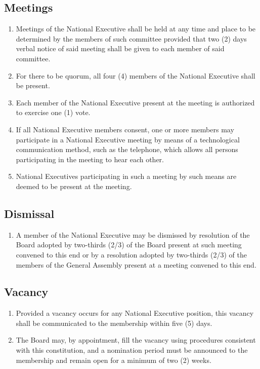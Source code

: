 \subsection{Meetings}
\label{meetings-1}

\begin{enumerate}
 \item
  Meetings of the National Executive shall be held at any time and place to be determined by the members of such committee provided that two (2) days verbal notice of said meeting shall be given to each member of said committee.
 \item
  For there to be quorum, all four (4) members of the National Executive shall be present.
 \item
  Each member of the National Executive present at the meeting is authorized to exercise one (1) vote.
 \item
  If all National Executive members consent, one or more members may participate in a National Executive meeting by means of a technological communication method, such as the telephone, which allows all persons participating in the meeting to hear each other.
 \item
  National Executives participating in such a meeting by such means are deemed to be present at the meeting.
\end{enumerate}

\subsection{Dismissal}
\label{dismissal}

\begin{enumerate}
 \item
  A member of the National Executive may be dismissed by resolution of the Board adopted by two-thirds (2/3) of the Board present at such meeting convened to this end or by a resolution adopted by two-thirds (2/3) of the members of the General Assembly present at a meeting convened to this end.
\end{enumerate}

\subsection{Vacancy}
\label{vacancy-1}

\begin{enumerate}
 \item
  Provided a vacancy occurs for any National Executive position, this vacancy shall be communicated to the membership within five (5) days.
 \item
  The Board may, by appointment, fill the vacancy using procedures consistent with this constitution, and a nomination period must be announced to the membership and remain open for a minimum of two (2) weeks.
\end{enumerate}

